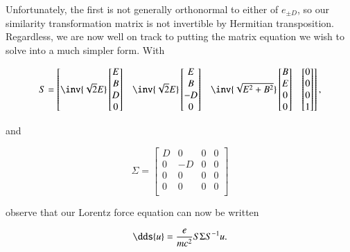 Unfortunately, the first is not generally orthonormal to either of $e_{\pm D}$, so our similarity transformation matrix is not invertible by Hermitian transposition.  Regardless, we are now well on track to putting the matrix equation we wish to solve into a much simpler form.  With

\begin{equation}\label{eqn:relElectroDynProblemSet2:710}
S =
\begin{bmatrix}
\inv{\sqrt{2}E}
\begin{bmatrix} 
E \\
B \\
D \\
0
\end{bmatrix} 
&
\inv{\sqrt{2}E}
\begin{bmatrix} 
E \\
B \\
-D \\
0
\end{bmatrix} &
\inv{\sqrt{E^2 + B^2}}
\begin{bmatrix} 
B \\
E \\
0 \\
0 
\end{bmatrix} &
\begin{bmatrix} 
0 \\
0 \\
0 \\
1 
\end{bmatrix}
\end{bmatrix},
\end{equation}

and 

\begin{equation}\label{eqn:relElectroDynProblemSet2:730}
\Sigma = 
\begin{bmatrix}
D & 0 & 0 & 0 \\
0 & -D & 0 & 0 \\
0 & 0 & 0 & 0 \\
0 & 0 & 0 & 0 \\
\end{bmatrix}
\end{equation}

observe that our Lorentz force equation can now be written

\begin{equation}\label{eqn:relElectroDynProblemSet2:750}
\dds{u} = \frac{e}{m c^2} S \Sigma S^{-1} u.
\end{equation}

